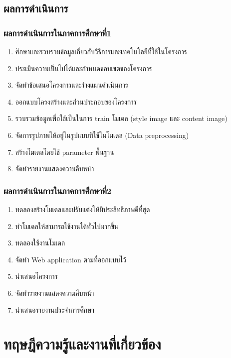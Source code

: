\documentclass[12pt,oneside,openright,a4paper]{cpe-thai-project}
\begin{document}
\section{ผลการดำเนินการ}
\subsection{ผลการดำเนินการในภาคการศึกษาที่1}
\begin{enumerate}
  \item ศึกษาและรวบรวมข้อมูลเกี่ยวกับวิธีการและเทคโนโลยีที่ใช้ในโครงการ
  \item ประเมินความเป็นไปได้และกำหนดขอบเขตของโครงการ
  \item จัดทำข้อเสนอโครงการและร่างแผนดำเนินการ
  \item ออกแบบโครงสร้างและส่วนประกอบของโครงการ
  \item รวบรวมข้อมูลเพื่อใช้เป็นในการ train โมเดล (style image และ content image)
  \item จัดการรูปภาพให้อยู่ในรูปแบบที่ใช้ในโมเดล (Data preprocessing)
  \item สร้างโมเดลโดยใช้ parameter พื้นฐาน
  \item จัดทำรายงานแสดงความคืบหน้า
\end{enumerate}

\newpage
\subsection{ผลการดำเนินการในภาคการศึกษาที่2}
\begin{enumerate}
  \item ทดลองสร้างโมเดลและปรับแต่งให้มีประสิทธิภาพดีที่สุด
  \item ทำโมเดลให้สามารถใช้งานได้ทั่วไปมากขึ้น
  \item ทดลองใช้งานโมเดล
  \item จัดทำ Web application ตามที่ออกแบบไว้
  \item นำเสนอโครงการ
  \item จัดทำรายงานแสดงความคืบหน้า
  \item นำเสนอรายงานประจำการศึกษา
\end{enumerate}


\chapter{ทฤษฎีความรู้และงานที่เกี่ยวข้อง}
\end{document}
